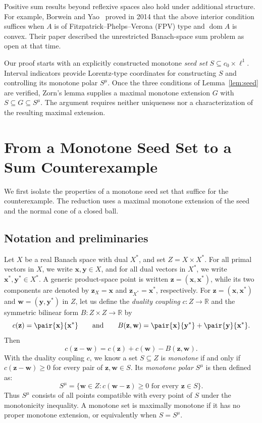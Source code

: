 \documentclass[11pt,a4paper]{article}
\theoremstyle{reportstyle}
\numberwithin{equation}{section}
\DeclareMathOperator{\dom}{dom}
\newcommand{\bx}{\mathbf x}
\newcommand{\by}{\mathbf y}
\newcommand{\bz}{\mathbf z}
\newcommand{\bw}{\mathbf w}
\begin{document}
	Positive sum results beyond reflexive spaces also hold under additional
	structure. For example, Borwein and Yao~\cite{borwein2014sum}
	proved in 2014 that the above interior condition suffices when $A$ is of
	Fitzpatrick--Phelps--Verona (FPV) type and $\dom A$ is convex.
	Their paper described the unrestricted Banach-space sum problem as open
	at that time.

	Our proof starts with an explicitly constructed monotone \emph{seed set}
	$S\subseteq c_0\times\ell^1$. Interval indicators provide Lorentz-type
	coordinates for constructing $S$ and controlling its monotone polar
	$S^\mu$. Once the three conditions of Lemma~\ref{lem:seed} are verified,
	Zorn's lemma supplies a maximal monotone extension $G$ with
	$S\subseteq G\subseteq S^\mu$. The argument requires neither uniqueness
	nor a characterization of the resulting maximal extension.

	\section{From a Monotone Seed Set to a Sum Counterexample}
	\label{sec:reduction}
	We first isolate the properties of a monotone seed set that suffice for
	the counterexample. The reduction uses a maximal monotone extension of
	the seed and the normal cone of a closed ball.


	\subsection{Notation and preliminaries}
	Let $X$ be a real Banach space with dual $X^*$, and set $Z=X\times X^*$.
	For all primal vectors in $X$, we write $\bx,\by\in X$, and for all dual
	vectors in $X^*$, we write $\bx^*,\by^*\in X^*$. A generic product-space point is written
	$\bz=(\bx,\bx^*)$, while its two components are denoted by $\bz_X=\bx$ and $\bz_{X^*}=\bx^*$, respectively. For $\bz=(\bx,\bx^*)$ and $\bw=(\by,\by^*)$ in $Z$, let us define the \emph{duality coupling} $c: Z \to \mathbb{R}$ and the symmetric bilinear form $B: Z \times Z \to \mathbb{R}$ by
	\begin{equation*}
		c(\bz)=\pair{\bx}{\bx^*} \qquad\mbox{and}\qquad B(\bz,\bw)=\pair{\bx}{\by^*}+\pair{\by}{\bx^*}.
	\end{equation*}
	Then
	\begin{equation*}
		c(\bz-\bw)=c(\bz)+c(\bw)-B(\bz,\bw).
	\end{equation*}
	With the duality coupling $c$, we know a set $S\subseteq Z$ is \emph{monotone} if and only if  $c(\bz-\bw)\ge0$ for every pair of $\bz,\bw\in S$. Its \emph{monotone polar} $S^\mu$ is then defined as:
	\begin{equation*}
		S^\mu=\{\bw\in Z:c(\bw-\bz)\ge0\text{ for every }\bz\in S\}.
	\end{equation*}
	Thus $S^\mu$ consists of all points compatible with every point of $S$
	under the monotonicity inequality. A monotone set is maximally monotone
	if it has no proper monotone extension, or equivalently when $S=S^\mu$.
\end{document}
